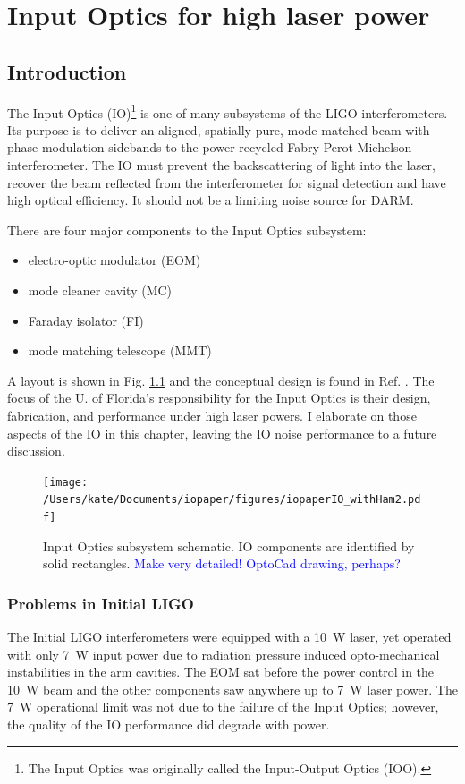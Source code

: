 \chapter{Input Optics for high laser power}%

\section{Introduction}%
The Input Optics (IO)\footnote{The Input Optics was originally called
  the Input-Output Optics (IOO).} is one of many subsystems of the
LIGO interferometers.  Its purpose is to deliver an aligned, spatially
pure, mode-matched beam with phase-modulation sidebands to the
power-recycled Fabry-Perot Michelson interferometer. The IO must
prevent the backscattering of light into the laser, recover the beam
reflected from the interferometer for signal detection and have high
optical efficiency. It should not be a limiting noise source for DARM.

There are four major components to the Input Optics subsystem:
\begin{itemize}
\item electro-optic modulator (EOM) \vspace{-10pt}%
\item mode cleaner cavity (MC) \vspace{-10pt}%
\item Faraday isolator (FI) \vspace{-10pt}%
\item mode matching telescope (MMT)
\end{itemize}
A layout is shown in Fig. \ref{fig:IOschematic} and the conceptual design is found in Ref. \cite{Camp1996InputOutput}. The focus of the U. of Florida's responsibility for the Input Optics is their design, fabrication, and performance under high laser powers. I elaborate on those aspects of the IO in this chapter, leaving the IO noise performance to a future discussion. 

\begin{figure}
\begin{centering}
\texttt{[image: /Users/kate/Documents/iopaper/figures/iopaperIO\_withHam2.pdf]}
\caption{Input Optics subsystem schematic. IO components are
  identified by solid rectangles. \textcolor{blue}{Make very detailed!
    OptoCad drawing, perhaps?}}
\label{fig:IOschematic}
\end{centering}
\end{figure}

\subsection{Problems in Initial LIGO}
The Initial LIGO interferometers were equipped with a 10~W laser, yet
operated with only 7~W input power due to radiation pressure induced
opto-mechanical instabilities in the arm cavities. The EOM sat
before the power control in the 10~W beam and the other components saw
anywhere up to 7~W laser power. The 7~W operational limit was not due
to the failure of the Input Optics; however, the quality of the IO
performance did degrade with power.

